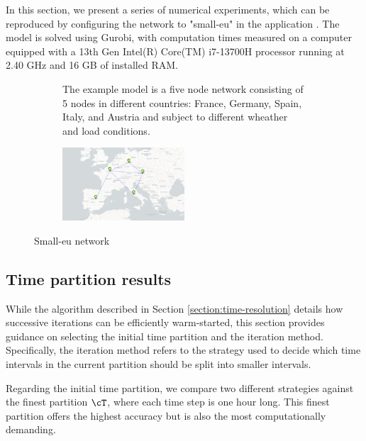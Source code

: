 \documentclass[english]{article}
\numberwithin{definition}{section}
\numberwithin{theorem}{section}
\numberwithin{problem}{section}
\begin{document}
In this section, we present a series of numerical experiments, which can be reproduced by configuring the network to "small-eu" in the application \cite{MOPTA}. The model is solved using Gurobi, with computation times measured on a computer equipped with a 13th Gen Intel(R) Core(TM) i7-13700H processor running at 2.40 GHz and 16 GB of installed RAM.
\begin{figure}[H]
\begin{subfigure}{0.5\textwidth}

\vspace{-10pt}

  The example model is a five node network consisting of 5 nodes in different countries: France, Germany, Spain, Italy, and Austria and subject to different wheather and load conditions.

\end{subfigure}
\begin{subfigure}{0.5\textwidth}
\centering
\vspace{-10pt}
\includegraphics*[width=0.5\textwidth]{immagini/small-eu-network.png}
\end{subfigure}
\caption{Small-eu network}
\label{fig:small eu network}
\end{figure}
\subsection{Time partition results}
While the algorithm described in Section \ref{section:time-resolution} details how successive iterations can be efficiently warm-started, this section provides guidance on selecting the initial time partition and the iteration method. Specifically, the iteration method refers to the strategy used to decide which time intervals in the current partition should be split into smaller intervals.

Regarding the initial time partition, we compare two different strategies against the finest partition \(\cT\), where each time step is one hour long. This finest partition offers the highest accuracy but is also the most computationally demanding.
\end{document}
